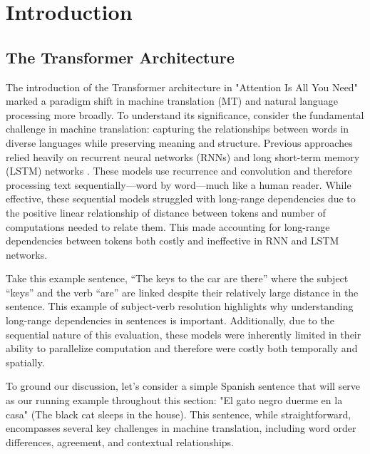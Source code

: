 

\chapter{Introduction}
\label{chap:introduction}

\section{The Transformer Architecture}

The introduction of the Transformer architecture in "Attention Is All You Need" \cite{NIPS2017_3f5ee243} marked a paradigm shift in machine translation (MT) and natural language processing more broadly. To understand its significance, consider the fundamental challenge in machine translation: capturing the relationships between words in diverse languages while preserving meaning and structure. Previous approaches relied heavily on recurrent neural networks (RNNs) and long short-term memory (LSTM) networks \cite{hochreiter1997long}. These models use recurrence and convolution and therefore processing text sequentially—word by word—much like a human reader. While effective, these sequential models struggled with long-range dependencies due to the positive linear relationship of distance between tokens and number of computations needed to relate them. This made accounting for long-range dependencies between tokens both costly and ineffective in RNN and LSTM networks. 

Take this example sentence, “The keys to the car are there” where the subject “keys” and the verb “are” are linked despite their relatively large distance in the sentence. This example of subject-verb resolution highlights why understanding long-range dependencies in sentences is important.  Additionally, due to the sequential nature of this evaluation, these models were inherently limited in their ability to parallelize computation and therefore were costly both temporally and spatially. 

To ground our discussion, let's consider a simple Spanish sentence that will serve as our running example throughout this section: "El gato negro duerme en la casa" (The black cat sleeps in the house). This sentence, while straightforward, encompasses several key challenges in machine translation, including word order differences, agreement, and contextual relationships.

